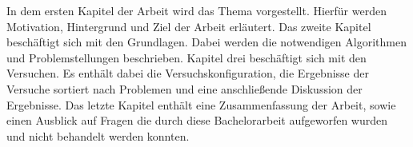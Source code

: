 In dem ersten Kapitel der Arbeit wird das Thema vorgestellt. Hierfür werden Motivation, Hintergrund und Ziel der Arbeit erläutert. Das zweite Kapitel beschäftigt sich mit den Grundlagen. Dabei werden die notwendigen Algorithmen und Problemstellungen beschrieben. Kapitel drei beschäftigt sich mit den Versuchen. Es enthält dabei die Versuchskonfiguration, die Ergebnisse der Versuche sortiert nach Problemen und eine anschließende Diskussion der Ergebnisse. Das letzte Kapitel enthält eine Zusammenfassung der Arbeit, sowie einen Ausblick auf Fragen die durch diese Bachelorarbeit aufgeworfen wurden und nicht behandelt werden konnten.